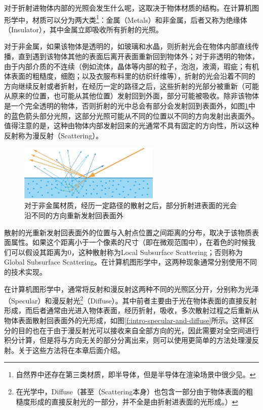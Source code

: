 对于折射进物体内部的光照会发生什么呢，这取决于物体材质的结构。在计算机图形学中，材质可以分为两大类\footnote{自然界中还存在第三类材质，即半导体，但是半导体在渲染场景中很少见。}：金属（Metals）和非金属，后者又称为绝缘体（Insulator），其中金属立即吸收所有折射的光照。


对于非金属，如果该物体是透明的，如玻璃和水晶，则折射光会在物体内部直线传播，直到遇到该物体其他的表面后离开表面重新回到物体外；对于非透明的物体，由于内部介质的不连续（例如流体，晶体等内部的粒子，泡泡，液滴，瑕疵；有机体表面的粗糙度，细胞；以及衣服布料里的纺织纤维等），折射的光会沿着不同的方向继续反射或者折射，在经历一定的路径之后，这些折射的光部分被重新（可能从原来的位置，也可能从其他位置）发射回到外面，部分可能被吸收。除非该物体是一个完全透明的物体，否则折射的光中总会有部分会发射回到表面外，如图\ref{f:intro-refraction}中的蓝色箭头部分光照，这部分光照可能从不同的位置以不同的方向发射出表面外。值得注意的是，这种由物体内部发射回来的光通常不具有固定的方向性，所以这种反射称为漫反射（Scattering）。

\begin{figure}
\sidecaption
	\includegraphics[width=0.6\textwidth]{figures/intro/ray-optics-5}
	\caption{对于非金属材质，经历一定路径的散射之后，部分折射进表面的光会沿不同的方向重新发射回表面外}
	\label{f:intro-refraction} 
\end{figure}

散射的光重新发射回表面外的位置与入射点位置之间距离的分布，取决于该物质表面属性。如果这个距离小于一个像素的尺寸（即在微观范围中），在着色的时候我们可以假设其距离为$0$，这种散射称为Local Subsurface Scattering；否则称为Global Subsurface Scattering。在计算机图形学中，这两种现象通常分别使用不同的技术实现。

在计算机图形学中，通常将反射和漫反射这两种不同的光照区分开，分别称为光泽（Specular）和漫反射光\footnote{在光学中，Diffuse（甚至（Scattering本身）也包含一部分由于物体表面的粗糙度形成的直接反射光的一部分，并不全是由折射进表面的光形成。）}（Diffuse）。其中前者主要由于光在物体表面的直接反射形成，而后者通常由光进入物体表面，经历折射，吸收，多次散射过程之后重新从物体表面散射回表面外的光形成，如图\ref{f:intro-specular-and-diffuse}所示。这样区分的目的也在于由于漫反射光可以接收来自全部方向的光，因此需要对全空间进行积分计算，但是将与方向无关的部分分离出来，则可以使用更简单的方法处理漫反射。关于这些方法将在本章后面介绍。

